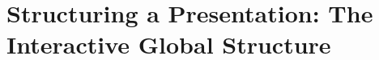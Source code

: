 \documentclass{beamer}
\begin{document}
\section{Structuring a Presentation: The Interactive Global Structure}
\end{document}
